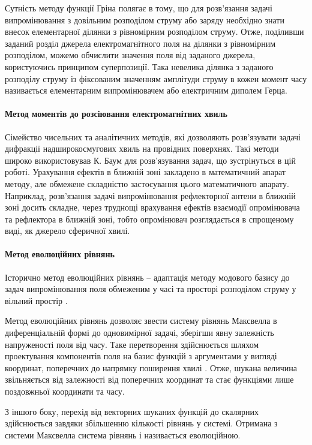 Сутність методу функції Гріна полягає в тому, що для розв'язання задачі 
випромінювання з довільним розподілом струму або заряду необхідно знати 
внесок елементарної ділянки з рівномірним розподілом струму. Отже, 
поділивши заданий розділ джерела електромагнітного поля на ділянки з 
рівномірним розподілом, можемо обчислити значення поля від заданого джерела, 
користуючись принципом суперпозиції. Така невелика ділянка з заданого розподілу 
струму із фіксованим значенням амплітуди струму в кожен момент часу називається
елементарним випромінювачем або електричним диполем Герца.

\paragraph{Метод моментів до розсіювання електромагнітних хвиль}

Сімейство чисельних та аналітичних методів, які дозволяють розв'язувати
задачі дифракції надширокосмугових хвиль на провідних поверхнях.
Такі методи широко використовував К. Баум для розв'язування задач, що 
зустрінуться в цій роботі. Урахування ефектів в ближній зоні закладено в
математичний апарат методу, але обмежене складністю застосування цього 
математичного апарату. Наприклад, розв'язання задачі випромінювання 
рефлекторної антени в ближній зоні досить складне, через труднощі врахування 
ефектів взаємодії опромінювача та рефлектора в ближній зоні, тобто 
опромінювач розглядається в спрощеному виді, як джерело сферичної хвилі.

\paragraph{Метод еволюційних рівнянь}

Історично метод еволюційних рівнянь -- адаптація методу модового базису 
\cite{imp:Tretyakov1986} до задач випромінювання поля обмеженим у часі та 
просторі розподілом струму у вільний простір \cite{imp:Tretyakov2004}.

Метод еволюційних рівнянь дозволяє звести систему рівнянь Максвелла в 
диференціальній формі до одновимірної задачі, зберігши явну залежність 
напруженості поля від часу. Таке перетворення здійснюється шляхом 
проектування компонентів поля на базис функцій з аргументами у вигляді 
координат, поперечних до напрямку поширення хвилі \cite{imp:Dumin2010}. 
Отже, шукана величина звільняється від залежності від поперечних 
координат та стає функціями лише поздовжньої координати та часу.

З іншого боку, перехід від векторних шуканих функцій до скалярних здійснюється
завдяки збільшенню кількості рівнянь у системі. Отримана з системи Максвелла
система рівнянь і називається еволюційною.

